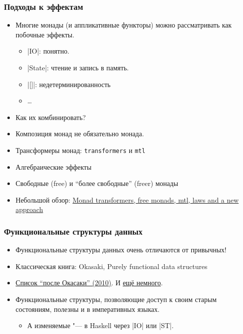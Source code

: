 \documentclass[11pt]{beamer}
\begin{document}
\begin{frame}[fragile]
\frametitle{Подходы к эффектам}
\begin{itemize}
    \item Многие монады (и аппликативные функторы) можно рассматривать как побочные эффекты.
    \begin{itemize}
        \item \haskinline|IO|: понятно.
        \item \haskinline|State|: чтение и запись в память.
        \item \haskinline|[]|: недетерминированность
        \item \ldots
    \end{itemize}
    \pause
    \item Как их комбинировать?
    \item Композиция монад не обязательно монада.
    \pause
    \item Трансформеры монад: \lstinline|transformers| и \lstinline|mtl|
    \item Алгебраические эффекты
    \item Свободные (free) и \enquote{более свободные} (freer) монады
    \item Небольшой обзор: \href{https://ocharles.org.uk/posts/2016-01-26-transformers-free-monads-mtl-laws.html}{Monad transformers, free monads, mtl, laws and a new approach}
\end{itemize}
\end{frame}

\begin{frame}[fragile]
\frametitle{Функциональные структуры данных}
\begin{itemize}
    \item Функциональные структуры данных очень отличаются от привычных!
    \item Классическая книга: Okasaki, Purely functional data structures
    \item \href{https://cstheory.stackexchange.com/questions/1539/whats-new-in-purely-functional-data-structures-since-okasaki}{Список \enquote{после Окасаки} (2010)}. И \href{https://www.reddit.com/r/haskell/comments/a4wk1i/seminal_works_after_purely_functional_data/ebm30ra/}{ещё немного}.
    \pause
    \item Функциональные структуры, позволяющие доступ к своим старым состояниям, полезны и в императивных языках.
    \begin{itemize}
        \item А изменяемые "--- в Haskell через \haskinline|IO| или \haskinline|ST|.
    \end{itemize}
\end{itemize}
\end{frame}
\end{document}
